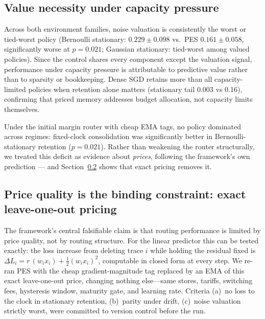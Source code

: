 \documentclass[11pt]{article}
\begin{document}
\subsection{Value necessity under capacity pressure}
Across both environment families, noise valuation is consistently the worst or tied-worst policy
(Bernoulli stationary: $0.229\pm0.098$ vs.\ PES $0.161\pm0.058$, significantly worse at $p=0.021$;
Gaussian stationary: tied-worst among valued policies). Since the control shares every component except
the valuation signal, performance under capacity pressure is attributable to predictive value rather
than to sparsity or bookkeeping. Dense SGD retains more than all capacity-limited policies when
retention alone matters (stationary tail 0.003 vs 0.16), confirming that priced memory addresses budget
allocation, not capacity limits themselves.

Under the initial margin router with cheap EMA tags, no policy dominated across regimes: fixed-clock
consolidation was significantly better in Bernoulli-stationary retention ($p=0.021$). Rather than
weakening the router structurally, we treated this deficit as evidence about \emph{prices}, following
the framework's own prediction --- and Section~\ref{sec:loo} shows that exact pricing removes it.

\subsection{Price quality is the binding constraint: exact leave-one-out pricing}
\label{sec:loo}

The framework's central falsifiable claim is that routing performance is limited by price quality, not
by routing structure. For the linear predictor this can be tested exactly: the loss increase from
deleting trace $i$ while holding the residual fixed is
$\Delta L_i = r\,(w_i x_i) + \tfrac{1}{2}(w_i x_i)^2$, computable in closed form at every step. We
re-ran PES with the cheap gradient-magnitude tag replaced by an EMA of this exact leave-one-out price,
changing nothing else---same stores, tariffs, switching fees, hysteresis window, maturity gate, and
learning rate. Criteria (a)~no loss to the clock in stationary retention, (b)~parity under drift,
(c)~noise valuation strictly worst, were committed to version control before the run.
\end{document}
